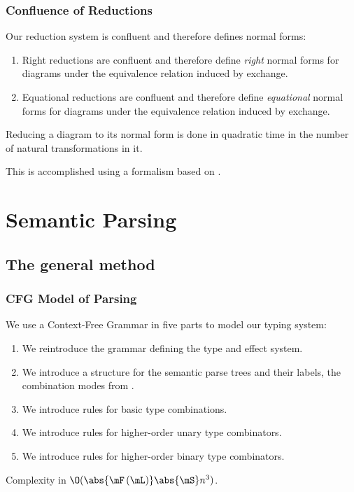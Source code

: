 \documentclass[math, english, info]{beamercours}
\begin{document}
\begin{frame}[allowframebreaks]
	\frametitle{Confluence of Reductions}
	\begin{thm}[Confluence]\label{thm:confluence}
		Our reduction system is confluent and therefore defines normal forms:
		\begin{enumerate}
			\item Right reductions are confluent and therefore define \emph{right} normal forms for
			      diagrams under the equivalence relation induced by exchange.
			\item Equational reductions are confluent and therefore define \emph{equational}
			      normal forms for diagrams under the equivalence relation induced by exchange.
		\end{enumerate}
	\end{thm}

	\smallskip

	\begin{thm}
		\label{thm:normalize}
		Reducing a diagram to its normal form is done in quadratic time in
		the number of natural transformations in it.
	\end{thm}
	This is accomplished using a formalism based on \cite{delpeuchNormalizationPlanarString2022}.
\end{frame}

\section{Semantic Parsing}
\subsection{The general method}
\begin{frame}
	\frametitle{CFG Model of Parsing}
	We use a Context-Free Grammar in five parts to model our typing system:

	\begin{enumerate}[<+->]
		\item We reintroduce the grammar defining the type and effect system.
		\item We introduce a structure for the semantic parse trees and their labels,
		      the combination modes from
		      \cite{bumfordEffectdrivenInterpretationFunctors2025}.
		\item We introduce rules for basic type combinations.
		\item We introduce rules for higher-order unary type combinators.
		\item We introduce rules for higher-order binary type combinators.
	\end{enumerate}
	\pause
	Complexity in $\O(\abs{\mF\left(\mL\right)}\abs{\mS}n^{3})$.
\end{frame}
\end{document}
